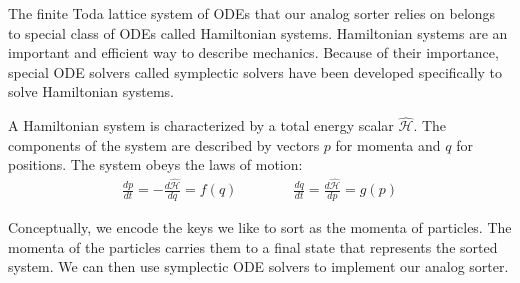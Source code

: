 \newcommand*{\hham}{\hat{\mathcal{H}}}
The finite Toda lattice system of ODEs that our analog sorter relies on belongs to special class of ODEs called Hamiltonian systems.
Hamiltonian systems are an important and efficient way to describe mechanics.
Because of their importance, special ODE solvers called symplectic solvers have been developed specifically to solve Hamiltonian systems.

A Hamiltonian system is characterized by a total energy scalar $\hham$.
The components of the system are described by vectors $p$ for momenta and $q$ for positions.
The system obeys the laws of motion:
\begin{align}
\frac{dp}{dt} = -\frac{d\hham}{dq} = f(q) \qquad \qquad
\frac{dq}{dt} = \frac{d\hham}{dp} = g(p)
\end{align}

Conceptually, we encode the keys we like to sort as the momenta of particles.
The momenta of the particles carries them to a final state that represents the sorted system.
We can then use symplectic ODE solvers to implement our analog sorter.